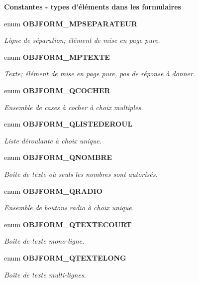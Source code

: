\begin{Indent}{\bf Constantes - types d'éléments dans les formulaires}\par
\begin{CompactItemize}
\item 
enum {\bf OBJFORM\_\-MPSEPARATEUR} 
\begin{CompactList}\small\item\em Ligne de séparation; élément de mise en page pure. \item\end{CompactList}\item 
enum {\bf OBJFORM\_\-MPTEXTE} 
\begin{CompactList}\small\item\em Texte; élément de mise en page pure, pas de réponse à donner. \item\end{CompactList}\item 
enum {\bf OBJFORM\_\-QCOCHER} 
\begin{CompactList}\small\item\em Ensemble de cases à cocher à choix multiples. \item\end{CompactList}\item 
enum {\bf OBJFORM\_\-QLISTEDEROUL} 
\begin{CompactList}\small\item\em Liste déroulante à choix unique. \item\end{CompactList}\item 
enum {\bf OBJFORM\_\-QNOMBRE} 
\begin{CompactList}\small\item\em Boîte de texte où seuls les nombres sont autorisés. \item\end{CompactList}\item 
enum {\bf OBJFORM\_\-QRADIO} 
\begin{CompactList}\small\item\em Ensemble de boutons radio à choix unique. \item\end{CompactList}\item 
enum {\bf OBJFORM\_\-QTEXTECOURT} 
\begin{CompactList}\small\item\em Boîte de texte mono-ligne. \item\end{CompactList}\item 
enum {\bf OBJFORM\_\-QTEXTELONG} 
\begin{CompactList}\small\item\em Boîte de texte multi-lignes. \item\end{CompactList}\end{CompactItemize}
\end{Indent}
